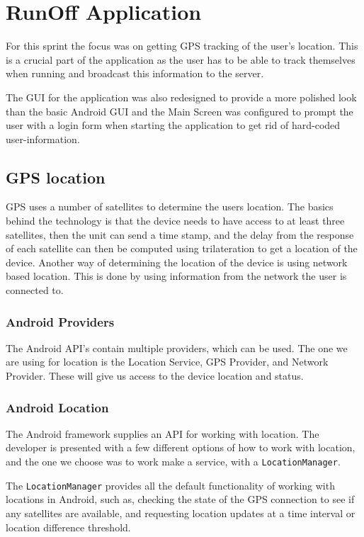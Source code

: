 \section{RunOff Application}
For this sprint the focus was on getting \ac{GPS} tracking of the user's location. This is a crucial part of the application as the user has to be able to track themselves when running and broadcast this information to the server.

The \ac{GUI} for the application was also redesigned to provide a more polished look than the basic Android \ac{GUI} and the Main Screen was configured to prompt the user with a login form when starting the application to get rid of hard-coded user-information.

\subsection{GPS location}
\ac{GPS} uses a number of satellites to determine the users location.
The basics behind the technology is that the device needs to have access to at least three satellites, then the unit can send a time stamp, and the delay from the response of each satellite can then be computed using trilateration to get a location of the device.
Another way of determining the location of the device is using network based location. This is done by using information from the network the user is connected to.

\subsubsection{Android Providers}
The Android \ac{API}'s contain multiple providers, which can be used. The one we are using for location is the Location Service, \ac{GPS} Provider, and Network Provider. These will give us access to the device location and status.


\subsubsection{Android Location}
The Android framework supplies an \ac{API} for working with location.
The developer is presented with a few different options of how to work with location, and the one we choose was to work make a service, with a \texttt{LocationManager}.

The \texttt{LocationManager} provides all the default functionality of working with locations in Android, such as, checking the state of the \ac{GPS} connection to see if any satellites are available, and requesting location updates at a time interval or location difference threshold.

